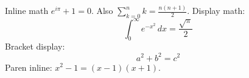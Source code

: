 \documentclass{article}
\begin{document}
Inline math $e^{i\pi} + 1 = 0$. Also $\sum_{k=0}^{n} k = \frac{n(n+1)}{2}$.
Display math: $$\int_0^\infty e^{-x^2}\, dx = \frac{\sqrt{\pi}}{2}$$
Bracket display: \[ a^2 + b^2 = c^2 \]
Paren inline: \( x^2 - 1 = (x-1)(x+1) \).
\end{document}
